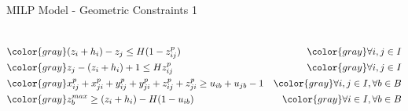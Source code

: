 \documentclass{beamer}
\begin{document}
\begin{frame}{MILP Model - Geometric Constraints 1}
\begin{columns}[onlytextwidth,T]
{\begin{minipage}{\linewidth}
\begin{align}
                                         & \color{gray} (z_i + h_i) - z_j\le H(1 - z^p_{ij})                                                     & \color{gray} \forall i,j \in I \notag \\
                                         & \color{gray} z_j - (z_i + h_i) + 1 \le H z^p_{ij}                                                     & \color{gray} \forall i,j \in I \notag \\
                                         & \color{gray} x^p_{ij} + x^p_{ji} + y^p_{ij} + y^p_{ji} + z^p_{ij} + z^p_{ji} \ge u_{ib} + u_{jb} - 1  & \color{gray} \forall i,j \in I, \forall b \in B \notag \\
                                         & \color{gray} z^{max}_b \ge (z_i + h_i) - H(1-u_{ib})                                                  & \color{gray} \forall i \in I, \forall b \in B \notag
                    \end{align}
                \end{minipage}
            }
            \end{columns}
    \end{frame}
\end{document}
